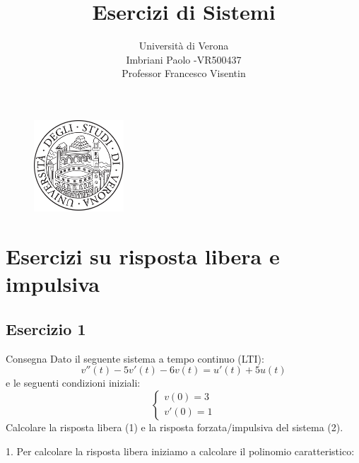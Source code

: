 \documentclass[a4paper]{article}
\title{Esercizi di Sistemi}
\author{Università di Verona\\Imbriani Paolo -VR500437\\Professor Francesco Visentin}
\begin{document}
\begin{figure}
    \centering
    \includegraphics[width=0.3\textwidth]{UniversityofVerona.png}
    \label{fig:centered-image}
\end{figure}

\maketitle 

\pagebreak

\tableofcontents

\pagebreak

\section{Esercizi su risposta libera e impulsiva}

\subsection{Esercizio 1}
\begin{examplebox}{Consegna}
Dato il seguente sistema a tempo continuo (LTI):
\[v''(t) - 5v'(t) - 6v(t) = u'(t) + 5u(t)\]
e le seguenti condizioni iniziali:
\[\begin{cases}
    v(0) = 3\\
    v'(0) = 1
\end{cases}\]
Calcolare la risposta libera (1) e la risposta forzata/impulsiva del sistema (2).
\end{examplebox}
1. Per calcolare la risposta libera iniziamo a calcolare il polinomio caratteristico:
\end{document}
